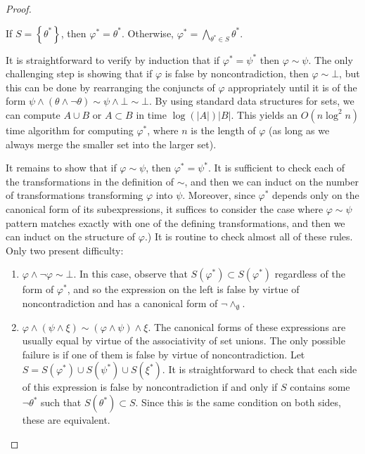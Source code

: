\documentclass[12pt]{article}
\theoremstyle{definition}
\newcommand{\of}[1]{\left(#1\right)}
\renewcommand{\b}[1]{\left\{#1\right\}}
\newcommand{\vp}{\varphi}
\newcommand{\abs}[1]{\left\vert#1\right\vert}
\begin{document}
{\begin{proof}
\begin{enumerate}[label=\textbf{Case \arabic*:}]
If $S = \b{\theta^*}$, then $\vp^* = \theta^*$.
Otherwise, $\vp^* = \bigwedge\limits_{\theta^* \in S} \theta^*$.

\end{enumerate}
It is straightforward to verify by induction that if $\vp^* = \psi^*$
then $\vp \sim \psi$.
The only challenging step is showing that if $\vp$ is false
by noncontradiction, then $\vp \sim \bot$,
but this can be done by rearranging the conjuncts of $\vp$
appropriately until it is of the form $\psi \wedge \of{\theta \wedge \neg \theta } \sim \psi \wedge \bot \sim \bot$.
By using standard data structures for sets,
we can compute $A \cup B$ or $A \subset B$
in time $\log\of{\abs{A}} \abs{B}$.
This yields an $O\of{n \log^2{n}}$ time algorithm
for computing $\vp^*$, where $n$ is the length of $\vp$
(as long as we always merge the smaller set into the larger set).

It remains to show that if $\vp \sim \psi$, then $\vp^* = \psi^*$.
It is sufficient to check each of the transformations in the definition of $\sim$,
and then we can induct on the number of transformations transforming $\vp$ into $\psi$.
Moreover, since $\vp^*$ depends only on the canonical form of its subexpressions,
it suffices to consider the case where $\vp \sim \psi$ pattern matches
exactly with one of the defining transformations, and then we can
induct on the structure of $\vp$.)
It is routine to check almost all of these rules.
Only two present difficulty:
\begin{enumerate}
\item $\vp \wedge \neg \vp \sim \bot$.
In this case, observe that $S\of{\vp^*} \subset S\of{\vp^*}$
regardless of the form of $\vp^*$, and so the expression
on the left is false by virtue of noncontradiction
and has a canonical form of $\neg \wedge_{\emptyset}$.
\item $\vp \wedge \of{\psi \wedge \xi} \sim \of{\vp \wedge \psi} \wedge \xi$.
The canonical forms of these expressions are usually equal by virtue
of the associativity of set unions.
The only possible failure is if one of them is false by virtue of noncontradiction.
Let $S = S\of{\vp^*} \cup S\of{\psi^*} \cup S\of{\xi^*}$.
It is straightforward to check that each side of this expression
is false by noncontradiction if and only if $S$ contains some $\neg \theta^*$
such that $S\of{\theta^*} \subset S$.
Since this is the same condition on both sides,
these are equivalent.
\end{enumerate}

\end{proof}
}
\end{document}
